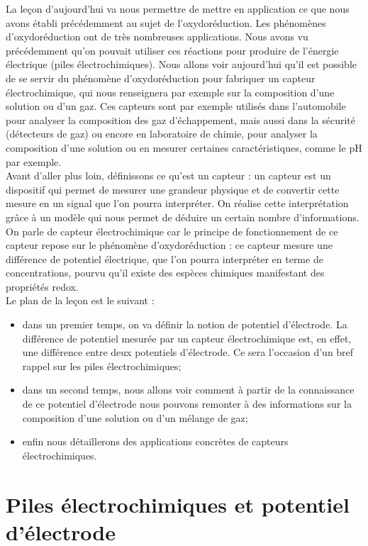 \documentclass[11pt,a4paper]{report}
\begin{document}
La leçon d'aujourd'hui va nous permettre de mettre en application ce que nous avons établi précédemment au sujet de l'oxydoréduction. Les phénomènes d'oxydoréduction ont de très nombreuses applications. Nous avons vu précédemment qu'on pouvait utiliser ces réactions pour produire de l'énergie électrique (piles électrochimiques). Nous allons voir aujourd'hui qu'il est possible de se servir du phénomène d'oxydoréduction pour fabriquer un capteur électrochimique, qui nous renseignera par exemple sur la composition d'une solution ou d'un gaz. Ces capteurs sont par exemple utilisés dans l'automobile pour analyser la composition des gaz d'échappement, mais aussi dans la sécurité (détecteurs de gaz) ou encore en laboratoire de chimie, pour analyser la composition d'une solution ou en mesurer certaines caractéristiques, comme le pH par exemple.\\

Avant d'aller plus loin, définissons ce qu'est un capteur : un capteur est un dispositif qui permet de mesurer une grandeur physique et de convertir cette mesure en un signal que l'on pourra interpréter. On réalise cette interprétation grâce à un modèle qui nous permet de déduire un certain nombre d'informations. On parle de capteur électrochimique car le principe de fonctionnement de ce capteur repose sur le phénomène d'oxydoréduction : ce capteur mesure une différence de potentiel électrique, que l'on pourra interpréter en terme de concentrations, pourvu qu'il existe des espèces chimiques manifestant des propriétés redox.\\

Le plan de la leçon est le suivant :
\begin{itemize}
	\item dans un premier temps, on va définir la notion de potentiel d'électrode. La différence de potentiel mesurée par un capteur électrochimique est, en effet, une différence entre deux potentiels d'électrode. Ce sera l'occasion d'un bref rappel sur les piles électrochimiques;
	\item dans un second temps, nous allons voir comment à partir de la connaissance de ce potentiel d'électrode nous pouvons remonter à des informations sur la composition d'une solution ou d'un mélange de gaz;
	\item enfin nous détaillerons des applications concrètes de capteurs électrochimiques.
\end{itemize}

\newpage
\section{Piles électrochimiques et potentiel d'électrode}
\end{document}
